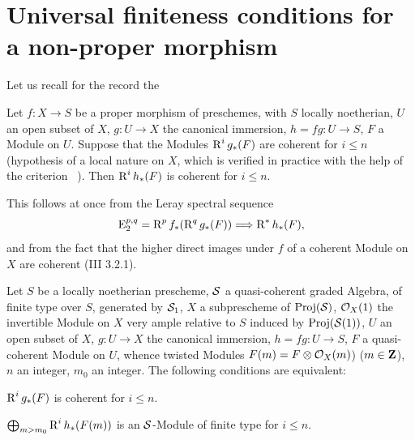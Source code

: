
\section[Universal finiteness conditions]
{Universal finiteness conditions for a non-proper morphism} \label{XII.5} Let us recall for the record the \setcounter{equation}{25}

\begin{proposition} \label{XII.5.1}
Let $f:X\to S$ be a proper morphism of preschemes, with $S$ locally noetherian, $U$ an open subset of $X$, $g:U\to X$ the canonical immersion, $h=fg:U\to S$, $F$ a Module on $U$. Suppose that the Modules $\operatorname{R}^ig_\ast(F)$ are coherent for $i\leq n$ (hypothesis of a local nature on $X$, which is verified in practice with the help of the criterion ~). Then $\operatorname{R}^ih_\ast(F)$ is coherent for $i\leq n$.
\end{proposition}

This follows at once from the Leray spectral sequence
\steco
\begin{equation} \label{eq:XII.26} {} \E_2^{p, q}=\R^pf_\ast(\R^qg_\ast(F)) \To \R^\ast h_\ast(F),
\end{equation}
and from the fact that the higher direct images under $f$ of a coherent Module on $X$ are coherent (\EGA III 3.2.1).

\begin{proposition} \label{XII.5.2}
Let $S$ be a locally noetherian prescheme, ${\mathcal S}$ a quasi-coherent graded Algebra, of finite type over $S$, generated by ${\mathcal S}_1$, $X$ a subprescheme of $\operatorname{Proj}({\mathcal S})$, $\mathcal{O}_X(1)$ the invertible Module on $X$ very ample relative to $S$ induced by $\operatorname{Proj}({\mathcal S}(1))$, $U$ an open subset of $X$, $g:U\to X$ the canonical immersion, $h=fg:U\to S$, $F$ a quasi-coherent Module on $U$, whence twisted Modules $F(m)=F\otimes \mathcal{O}_X(m)$) ($m\in\mathbf{Z}$), $n$ an integer, $m_0$ an integer. The following conditions are equivalent:
\begin{enumeratei}
\item
$\operatorname{R}^ig_\ast(F)$ is coherent for $i\leq n$.
\item
$\bigoplus_{m>m_0}\operatorname{R}^ih_\ast(F(m))$ is an ${\mathcal S}$-Module of finite type for $i\leq n$.
\end{enumeratei}
\end{proposition}

